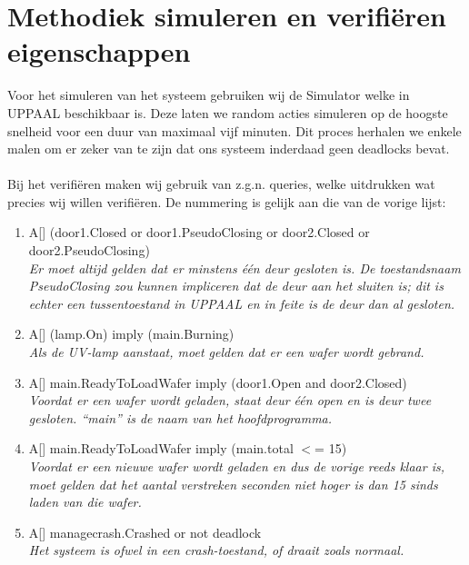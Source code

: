     \section{Methodiek simuleren en verifi\"eren eigenschappen}
        Voor het simuleren van het systeem gebruiken wij de Simulator welke in UPPAAL beschikbaar is. Deze
        laten we random acties simuleren op de hoogste snelheid voor een duur van maximaal vijf minuten. Dit
        proces herhalen we enkele malen om er zeker van te zijn dat ons systeem inderdaad geen deadlocks bevat.\\
        \\
        Bij het verifi\"eren maken wij gebruik van z.g.n. queries, welke uitdrukken wat precies wij willen
        verifi\"eren. De nummering is gelijk aan die van de vorige lijst:
        \begin{enumerate}
            \item A[] (door1.Closed or door1.PseudoClosing or door2.Closed or door2.PseudoClosing)\\
                \emph{    Er moet altijd gelden dat er minstens \'{e}\'{e}n deur gesloten is. De toestandsnaam PseudoClosing
                            zou kunnen impliceren dat de deur aan het sluiten is; dit is echter een tussentoestand
                            in UPPAAL en in feite is de deur dan al gesloten.}
            \item A[] (lamp.On) imply (main.Burning)\\
                \emph{    Als de UV-lamp aanstaat, moet gelden dat er een wafer wordt gebrand.}
            \item A[] main.ReadyToLoadWafer imply (door1.Open and door2.Closed)\\
                \emph{    Voordat er een wafer wordt geladen, staat deur \'{e}\'{e}n open en is deur twee gesloten. ``main'' is de naam
                van het hoofdprogramma.}
            \item A[] main.ReadyToLoadWafer imply (main.total $<$= 15)\\
                \emph{    Voordat er een nieuwe wafer wordt geladen en dus de vorige reeds klaar is, moet
                            gelden dat het aantal verstreken seconden niet hoger is dan 15 sinds laden van
                            die wafer.}
            \item A[] managecrash.Crashed or not deadlock\\
                \emph{    Het systeem is ofwel in een crash-toestand, of draait zoals normaal.}
        \end{enumerate}

